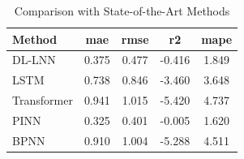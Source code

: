 \begin{table}[htbp]
\centering
\caption{Comparison with State-of-the-Art Methods}
\label{tab:table2_main_results_synthetic}
\begin{tabular}{lcccc}
\toprule
Method & \textbf{mae} & \textbf{rmse} & \textbf{r2} & \textbf{mape} \\
\midrule
DL-LNN & 0.375 & 0.477 & -0.416 & 1.849 \\
LSTM & 0.738 & 0.846 & -3.460 & 3.648 \\
Transformer & 0.941 & 1.015 & -5.420 & 4.737 \\
PINN & 0.325 & 0.401 & -0.005 & 1.620 \\
BPNN & 0.910 & 1.004 & -5.288 & 4.511 \\
\bottomrule
\end{tabular}
\end{table}